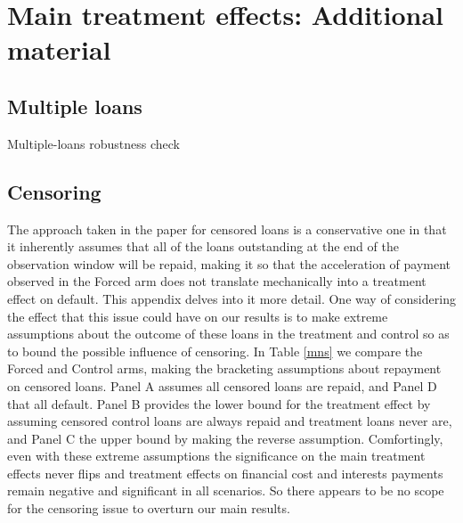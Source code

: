 \newpage
\section{Main treatment effects: Additional material}


\begin{landscape}
\subsection{Multiple loans}

\begin{table}[H]
\caption{Multiple-loans robustness check}
\label{multiple_loans}
\begin{center}
\scriptsize{}
\end{center}
 \scriptsize
\end{table}

\end{landscape}




\subsection{Censoring} \label{App_censoring}

\vspace{.2in}
\normalsize
The approach taken in the paper for censored loans is a conservative one in that it inherently assumes that all of the loans outstanding at the end of the observation window will be repaid, making it so that the acceleration of payment observed in the Forced arm does not translate mechanically into a treatment effect on default.  This appendix delves into it more detail.  One way of considering the effect that this issue could have on our results is to make extreme assumptions about the outcome of these loans in the treatment and control so as to bound the possible influence of censoring.  In Table \ref{mns} we compare the Forced and Control arms, making the bracketing assumptions about repayment on censored loans.  Panel A assumes all censored loans are repaid, and Panel D that all default.  Panel B provides the lower bound for the treatment effect by assuming censored control loans are always repaid and treatment loans never are, and Panel C the upper bound by making the reverse assumption.  Comfortingly, even with these extreme assumptions the significance on the main treatment effects never flips and treatment effects on financial cost and interests payments remain negative and significant in all scenarios.  So there appears to be no scope for the censoring issue to overturn our main results. 

